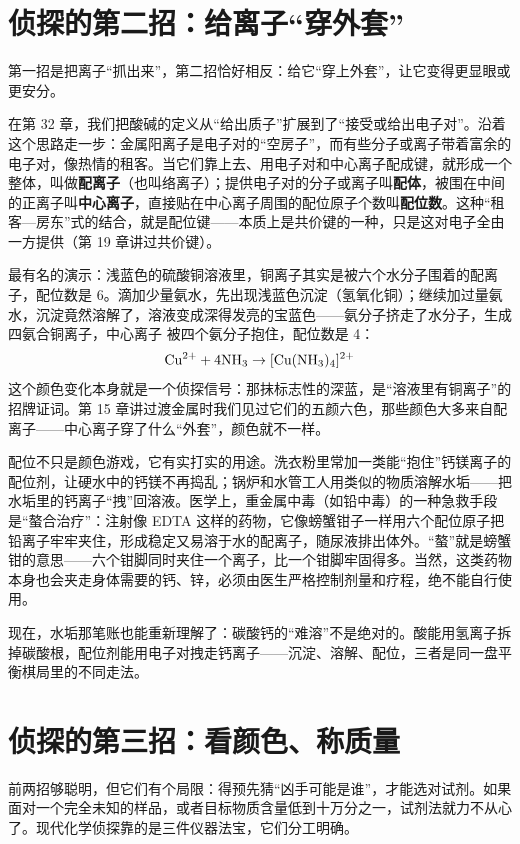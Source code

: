 \section{侦探的第二招：给离子“穿外套”}

第一招是把离子“抓出来”，第二招恰好相反：给它“穿上外套”，让它变得更显眼或更安分。

在第 32 章，我们把酸碱的定义从“给出质子”扩展到了“接受或给出电子对”。沿着这个思路走一步：金属阳离子是电子对的“空房子”，而有些分子或离子带着富余的电子对，像热情的租客。当它们靠上去、用电子对和中心离子配成键，就形成一个整体，叫做\textbf{配离子}（也叫络离子）；提供电子对的分子或离子叫\textbf{配体}，被围在中间的正离子叫\textbf{中心离子}，直接贴在中心离子周围的配位原子个数叫\textbf{配位数}。这种“租客—房东”式的结合，就是配位键——本质上是共价键的一种，只是这对电子全由一方提供（第 19 章讲过共价键）。

最有名的演示：浅蓝色的硫酸铜溶液里，铜离子其实是被六个水分子围着的配离子，配位数是 6。滴加少量氨水，先出现浅蓝色沉淀（氢氧化铜）；继续加过量氨水，沉淀竟然溶解了，溶液变成深得发亮的宝蓝色——氨分子挤走了水分子，生成四氨合铜离子，中心离子  被四个氨分子抱住，配位数是 4：
\[\mathrm{Cu^{2+}} + 4\mathrm{NH_3} \rightarrow [\mathrm{Cu(NH_3)_4}]^{2+}\]
这个颜色变化本身就是一个侦探信号：那抹标志性的深蓝，是“溶液里有铜离子”的招牌证词。第 15 章讲过渡金属时我们见过它们的五颜六色，那些颜色大多来自配离子——中心离子穿了什么“外套”，颜色就不一样。

配位不只是颜色游戏，它有实打实的用途。洗衣粉里常加一类能“抱住”钙镁离子的配位剂，让硬水中的钙镁不再捣乱；锅炉和水管工人用类似的物质溶解水垢——把水垢里的钙离子“拽”回溶液。医学上，重金属中毒（如铅中毒）的一种急救手段是“螯合治疗”：注射像 EDTA 这样的药物，它像螃蟹钳子一样用六个配位原子把铅离子牢牢夹住，形成稳定又易溶于水的配离子，随尿液排出体外。“螯”就是螃蟹钳的意思——六个钳脚同时夹住一个离子，比一个钳脚牢固得多。当然，这类药物本身也会夹走身体需要的钙、锌，必须由医生严格控制剂量和疗程，绝不能自行使用。

现在，水垢那笔账也能重新理解了：碳酸钙的“难溶”不是绝对的。酸能用氢离子拆掉碳酸根，配位剂能用电子对拽走钙离子——沉淀、溶解、配位，三者是同一盘平衡棋局里的不同走法。

\section{侦探的第三招：看颜色、称质量}

前两招够聪明，但它们有个局限：得预先猜“凶手可能是谁”，才能选对试剂。如果面对一个完全未知的样品，或者目标物质含量低到十万分之一，试剂法就力不从心了。现代化学侦探靠的是三件仪器法宝，它们分工明确。

